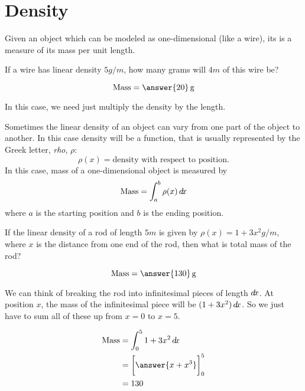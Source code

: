 \documentclass{ximera}
\begin{document}
\section{Density}

Given an object which can be modeled as one-dimensional (like a wire),
its  is a measure of its mass per unit length.

\begin{question}
  If a wire has linear density $5 \unit{g}/\unit{m}$, how many grams
  will $4 \unit{m}$ of this wire be?
  \begin{prompt}
  \[
  \text{Mass} = \answer{20} \unit{g}
  \]
  \end{prompt}
  \begin{hint}
    In this case, we need just multiply the density by the length.
  \end{hint}
\end{question}

Sometimes the linear density of an object can vary from one part of
the object to another. In this case density will be a function, that
is usually represented by the Greek letter, \textit{rho}, $\rho$:
\[
\rho(x) = \text{density with respect to position.}
\]
In this case, mass of a one-dimensional object is measured by
\[
\text{Mass} = \int_{a}^{b} \rho(x) \mathop{}\!d\! x
\]
where $a$ is the starting position and $b$ is the ending position.

\begin{question}
  If the linear density of a rod of length $5\unit{m}$ is given by
  $\rho(x) = 1+3x^2 \unit{g}/\unit{m}$, where $x$ is the distance from
  one end of the rod, then what is total mass of the rod?
  \begin{prompt}
    \[
    \text{Mass} = \answer{130} \unit{g}
    \]
  \end{prompt}
  \begin{hint}
    We can think of breaking the rod into infinitesimal pieces of
    length $\mathop{}\!d\! x$.  At position $x$, the mass of the infinitesimal
    piece will be $(1+3x^2)\mathop{}\!d\! x$.  So we just have to sum all of these
    up from $x=0$ to $x=5$.
  \end{hint}
  \begin{hint}
    \begin{align*}
      \text{Mass} &= \int_0^5 1+3x^2 \d x\\
      &=\eval{\answer{x+x^3}}_0^5\\
      &=130
    \end{align*}
  \end{hint}
\end{question}
\end{document}

